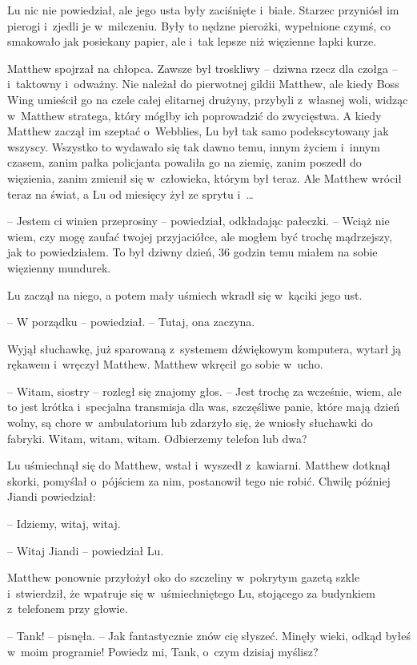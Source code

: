 \documentclass[oneside,polish,11pt,rmheadings]{mwbk}
\begin{document}
Lu nic nie powiedział, ale jego usta były zaciśnięte i~białe. Starzec przyniósł im pierogi i~zjedli je w~milczeniu. Były to nędzne pierożki, wypełnione czymś, co smakowało jak posiekany papier, ale i~tak lepsze niż więzienne łapki kurze.

Matthew spojrzał na chłopca. Zawsze był troskliwy -- dziwna rzecz dla czołga -- i~taktowny i~odważny. Nie należał do pierwotnej gildii Matthew, ale kiedy Boss Wing umieścił go na czele całej elitarnej drużyny, przybyli z~własnej woli, widząc w~Matthew stratega, który mógłby ich poprowadzić do zwycięstwa. A kiedy Matthew zaczął im szeptać o~Webblies, Lu był tak samo podekscytowany jak wszyscy. Wszystko to wydawało się tak dawno temu, innym życiem i~innym czasem, zanim pałka policjanta powaliła go na ziemię, zanim poszedł do więzienia, zanim zmienił się w~człowieka, którym był teraz. Ale Matthew wrócił teraz na świat, a Lu od miesięcy żył ze sprytu i~\ldots 

-- Jestem ci winien przeprosiny -- powiedział, odkładając pałeczki. -- Wciąż nie wiem, czy mogę zaufać twojej przyjaciółce, ale mogłem być trochę mądrzejszy, jak to powiedziałem. To był dziwny dzień, 36 godzin temu miałem na sobie więzienny mundurek.

Lu zaczął na niego, a potem mały uśmiech wkradł się w~kąciki jego ust. 

-- W porządku -- powiedział. -- Tutaj, ona zaczyna. 

Wyjął słuchawkę, już sparowaną z~systemem dźwiękowym komputera, wytarł ją rękawem i~wręczył Matthew. Matthew wkręcił go sobie w~ucho.

-- Witam, siostry -- rozległ się znajomy głos. -- Jest trochę za wcześnie, wiem, ale to jest krótka i~specjalna transmisja dla was, szczęśliwe panie, które mają dzień wolny, są chore w~ambulatorium lub zdarzyło się, że wniosły słuchawki do fabryki. Witam, witam, witam. Odbierzemy telefon lub dwa?

Lu uśmiechnął się do Matthew, wstał i~wyszedł z~kawiarni. Matthew dotknął skorki, pomyślał o~pójściem za nim, postanowił tego nie robić. Chwilę później Jiandi powiedział: 

-- Idziemy, witaj, witaj.

-- Witaj Jiandi -- powiedział Lu. 

Matthew ponownie przyłożył oko do szczeliny w~pokrytym gazetą szkle i~stwierdził, że wpatruje się w~uśmiechniętego Lu, stojącego za budynkiem z~telefonem przy głowie.

-- Tank! -- pisnęła. -- Jak fantastycznie znów cię słyszeć. Minęły wieki, odkąd byłeś w~moim programie! Powiedz mi, Tank, o~czym dzisiaj myślisz?
\end{document}
